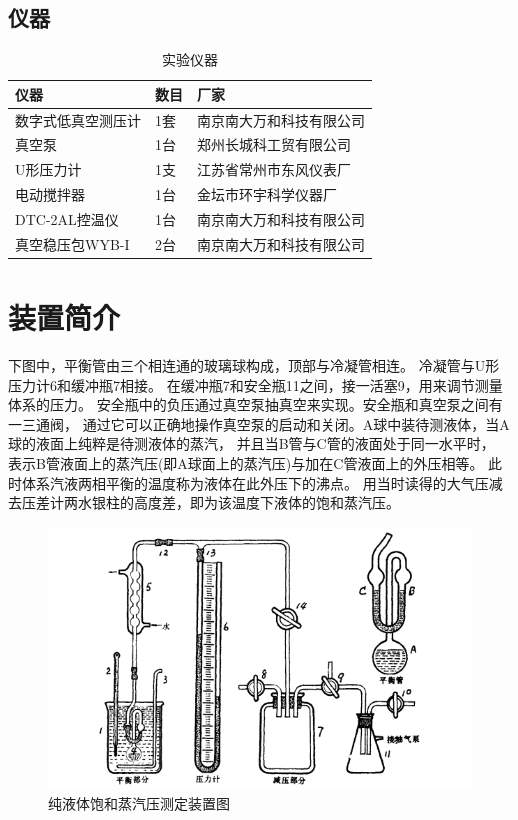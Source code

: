 \documentclass[11pt]{report}
\begin{document}
\section{仪器}
\label{sec:org8be506e}
\begin{table}[htbp]
\caption{实验仪器}
\centering
\begin{tabular}{lll}
仪器 & 数目 & 厂家\\
\hline
数字式低真空测压计 & 1套 & 南京南大万和科技有限公司\\
真空泵 & 1台 & 郑州长城科工贸有限公司\\
U形压力计 & 1支 & 江苏省常州市东风仪表厂\\
电动搅拌器 & 1台 & 金坛市环宇科学仪器厂\\
DTC-2AL控温仪 & 1台 & 南京南大万和科技有限公司\\
真空稳压包WYB-I & 2台 & 南京南大万和科技有限公司\\
\end{tabular}
\end{table}

\chapter{装置简介}
\label{sec:org4bd73a0}
下图中，平衡管由三个相连通的玻璃球构成，顶部与冷凝管相连。
冷凝管与U形压力计6和缓冲瓶7相接。
在缓冲瓶7和安全瓶11之间，接一活塞9，用来调节测量体系的压力。
安全瓶中的负压通过真空泵抽真空来实现。安全瓶和真空泵之间有一三通阀，
通过它可以正确地操作真空泵的启动和关闭。A球中装待测液体，当A球的液面上纯粹是待测液体的蒸汽，
并且当B管与C管的液面处于同一水平时，
表示B管液面上的蒸汽压(即A球面上的蒸汽压)与加在C管液面上的外压相等。
此时体系汽液两相平衡的温度称为液体在此外压下的沸点。
用当时读得的大气压减去压差计两水银柱的高度差，即为该温度下液体的饱和蒸汽压。

\begin{figure}[htbp]
\centering
\includegraphics[width=.9\linewidth]{../img/1.png}
\caption{纯液体饱和蒸汽压测定装置图}
\end{figure}
\end{document}
